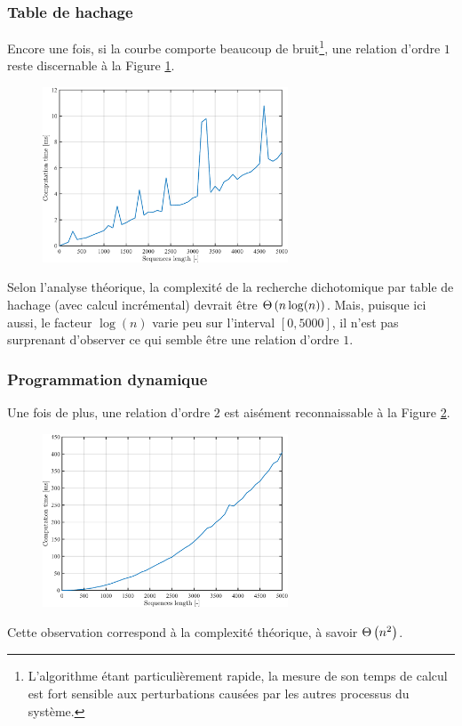 \documentclass[a4paper, 12pt]{article}
\begin{document}
	\subsubsection*{Table de hachage}
	Encore une fois, si la courbe comporte beaucoup de bruit\footnote{L'algorithme étant particulièrement rapide, la mesure de son temps de calcul est fort sensible aux perturbations causées par les autres processus du système.}, une relation d'ordre $1$ reste discernable à la Figure \ref{fig:hash}.
	\begin{figure}[H]
		\centering
		\includegraphics[width=0.65\textwidth]{resources/pdf/hash.pdf}
		\label{fig:hash}
	\end{figure}
	Selon l'analyse théorique, la complexité de la recherche dichotomique par table de hachage (avec calcul incrémental) devrait être $\Theta\left(n \log(n)\right)$. Mais, puisque ici aussi, le facteur $\log(n)$ varie peu sur l'interval $[0, 5000]$, il n'est pas surprenant d'observer ce qui semble être une relation d'ordre $1$.
	\subsubsection*{Programmation dynamique}
	Une fois de plus, une relation d'ordre $2$ est aisément reconnaissable à la Figure \ref{fig:dynamic}.
	\begin{figure}[H]
		\centering
		\includegraphics[width=0.65\textwidth]{resources/pdf/dynamic.pdf}
		\label{fig:dynamic}
	\end{figure}
	Cette observation correspond à la complexité théorique, à savoir $\Theta\left(n^2\right)$.
	\newpage
\end{document}
